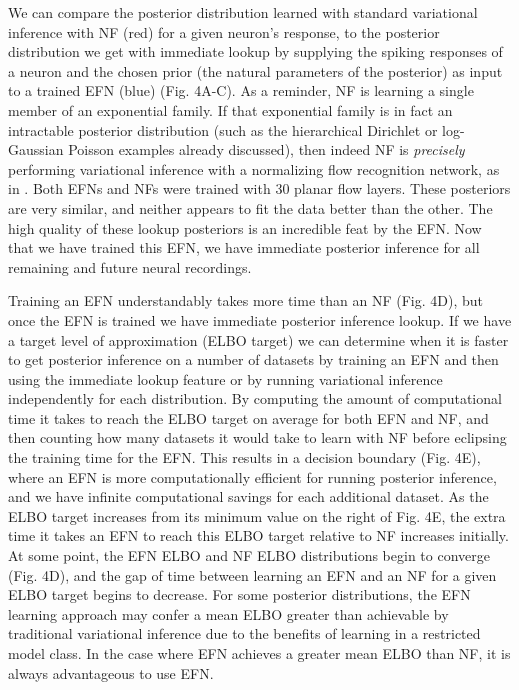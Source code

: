\documentclass{article}
\begin{document}
We can compare the posterior distribution learned with standard variational inference with NF (red) for a given neuron’s response, to the posterior distribution we get with immediate lookup by supplying the spiking responses of a neuron and the chosen prior (the natural parameters of the posterior) as input to a trained EFN (blue) (Fig. 4A-C).  As a reminder, NF is learning a single member of an exponential family.  If that exponential family is in fact an intractable posterior distribution (such as the hierarchical Dirichlet or log-Gaussian Poisson examples already discussed), then indeed NF is \emph{precisely} performing variational inference with a normalizing flow recognition network, as in \citep{rezende2015variational, dinh2016density, papamakarios2017masked}.  Both EFNs and NFs were trained with 30 planar flow layers.  These posteriors are very similar, and neither appears to fit the data better than the other.  The high quality of these lookup posteriors is an incredible feat by the EFN.  Now that we have trained this EFN, we have immediate posterior inference for all remaining and future neural recordings.

Training an EFN understandably takes more time than an NF (Fig. 4D), but once the EFN is trained we have immediate posterior inference lookup.  If we have a target level of approximation (ELBO target) we can determine when it is faster to get posterior inference on a number of datasets by training an EFN and then using the immediate lookup feature or by running variational inference independently for each distribution.  By computing the amount of computational time it takes to reach the ELBO target on average for both EFN and NF, and then counting how many datasets it would take to learn with NF before eclipsing the training time for the EFN.  This results in a decision boundary (Fig. 4E), where an EFN is more computationally efficient for running posterior inference, and we have infinite computational savings for each additional dataset.  As the ELBO target increases from its minimum value on the right of Fig. 4E, the extra time it takes an EFN to reach this ELBO target relative to NF increases initially.  At some point, the EFN ELBO and NF ELBO distributions begin to converge (Fig. 4D), and the gap of time between learning an EFN and an NF for a given ELBO target begins to decrease.  For some posterior distributions, the EFN learning approach may confer a mean ELBO greater than achievable by traditional variational inference due to the benefits of learning in a restricted model class.  In the case where EFN achieves a greater mean ELBO than NF, it is always advantageous to use EFN.
\end{document}
